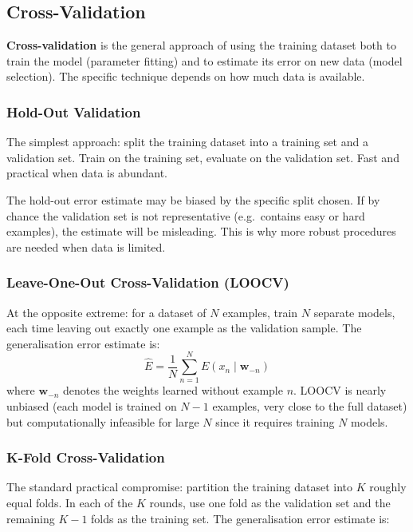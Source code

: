 \documentclass[11pt,a4paper]{article}
\newcommand{\term}[1]{\textcolor{DefGreen}{\textbf{#1}}\index{#1}}
\begin{document}
\subsection{Cross-Validation}

\term{Cross-validation} is the general approach of using the training dataset both to train the model (parameter fitting) and to estimate its error on new data (model selection). The specific technique depends on how much data is available.

\subsubsection{Hold-Out Validation}

The simplest approach: split the training dataset into a training set and a validation set. Train on the training set, evaluate on the validation set. Fast and practical when data is abundant.

\begin{notebox}
The hold-out error estimate may be biased by the specific split chosen. If by chance the validation set is not representative (e.g.\ contains easy or hard examples), the estimate will be misleading. This is why more robust procedures are needed when data is limited.
\end{notebox}

\subsubsection{Leave-One-Out Cross-Validation (LOOCV)}

At the opposite extreme: for a dataset of $N$ examples, train $N$ separate models, each time leaving out exactly one example as the validation sample. The generalisation error estimate is:
\[
\hat{E} = \frac{1}{N}\sum_{n=1}^N E(x_n \mid \mathbf{w}_{-n})
\]
where $\mathbf{w}_{-n}$ denotes the weights learned without example $n$. LOOCV is nearly unbiased (each model is trained on $N-1$ examples, very close to the full dataset) but computationally infeasible for large $N$ since it requires training $N$ models.

\subsubsection{K-Fold Cross-Validation}

The standard practical compromise: partition the training dataset into $K$ roughly equal folds. In each of the $K$ rounds, use one fold as the validation set and the remaining $K-1$ folds as the training set. The generalisation error estimate is:
\end{document}
